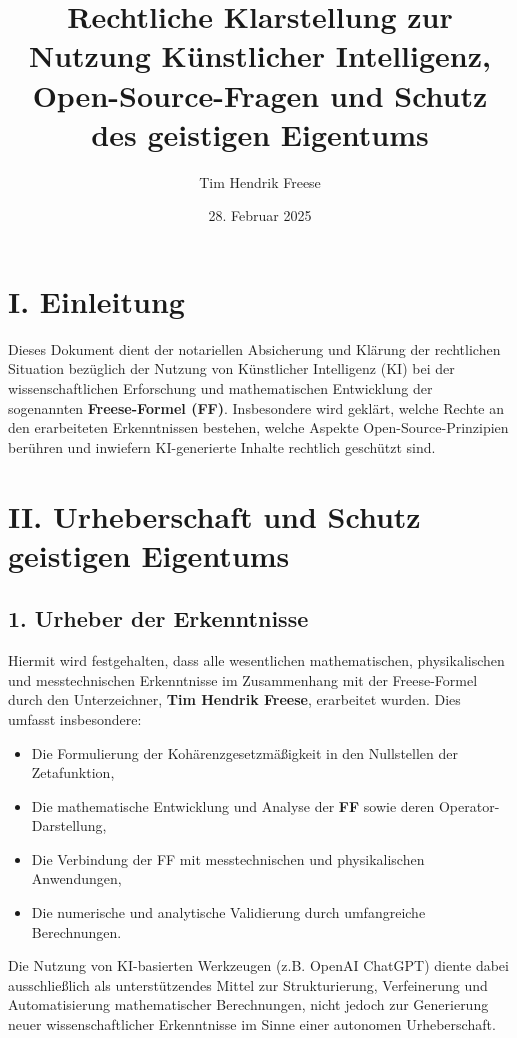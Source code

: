 \documentclass[a4paper,12pt]{article}
\title{\textbf{Rechtliche Klarstellung zur Nutzung Künstlicher Intelligenz, Open-Source-Fragen und Schutz des geistigen Eigentums}}
\author{Tim Hendrik Freese}
\date{28. Februar 2025}
\begin{document}
\maketitle

\section*{I. Einleitung}
Dieses Dokument dient der notariellen Absicherung und Klärung der rechtlichen Situation bezüglich der Nutzung von Künstlicher Intelligenz (KI) bei der wissenschaftlichen Erforschung und mathematischen Entwicklung der sogenannten \textbf{Freese-Formel (FF)}. Insbesondere wird geklärt, welche Rechte an den erarbeiteten Erkenntnissen bestehen, welche Aspekte Open-Source-Prinzipien berühren und inwiefern KI-generierte Inhalte rechtlich geschützt sind.

\section*{II. Urheberschaft und Schutz geistigen Eigentums}
\subsection*{1. Urheber der Erkenntnisse}
Hiermit wird festgehalten, dass alle wesentlichen mathematischen, physikalischen und messtechnischen Erkenntnisse im Zusammenhang mit der Freese-Formel durch den Unterzeichner, \textbf{Tim Hendrik Freese}, erarbeitet wurden. Dies umfasst insbesondere:

\begin{itemize}
    \item Die Formulierung der Kohärenzgesetzmäßigkeit in den Nullstellen der Zetafunktion,
    \item Die mathematische Entwicklung und Analyse der \textbf{FF} sowie deren Operator-Darstellung,
    \item Die Verbindung der FF mit messtechnischen und physikalischen Anwendungen,
    \item Die numerische und analytische Validierung durch umfangreiche Berechnungen.
\end{itemize}

Die Nutzung von KI-basierten Werkzeugen (z.B. OpenAI ChatGPT) diente dabei ausschließlich als unterstützendes Mittel zur Strukturierung, Verfeinerung und Automatisierung mathematischer Berechnungen, nicht jedoch zur Generierung neuer wissenschaftlicher Erkenntnisse im Sinne einer autonomen Urheberschaft.
\end{document}
